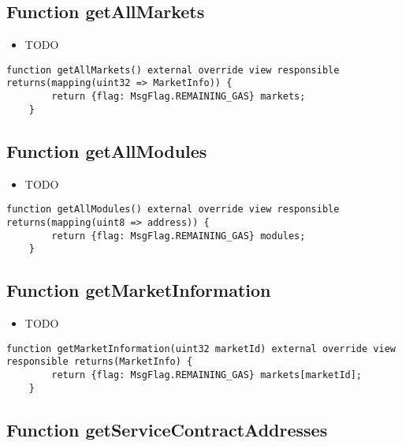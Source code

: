 \subsection{Function getAllMarkets}

\noindent\begin{itemize}
\item TODO
\end{itemize}

\begin{lstlisting}[firstnumber=227]
    function getAllMarkets() external override view responsible returns(mapping(uint32 => MarketInfo)) {
        return {flag: MsgFlag.REMAINING_GAS} markets;
    }
\end{lstlisting}

\subsection{Function getAllModules}

\noindent\begin{itemize}
\item TODO
\end{itemize}

\begin{lstlisting}[firstnumber=236]
    function getAllModules() external override view responsible returns(mapping(uint8 => address)) {
        return {flag: MsgFlag.REMAINING_GAS} modules;
    }
\end{lstlisting}

\subsection{Function getMarketInformation}

\noindent\begin{itemize}
\item TODO
\end{itemize}

\begin{lstlisting}[firstnumber=223]
    function getMarketInformation(uint32 marketId) external override view responsible returns(MarketInfo) {
        return {flag: MsgFlag.REMAINING_GAS} markets[marketId];
    }
\end{lstlisting}

\subsection{Function getServiceContractAddresses}

